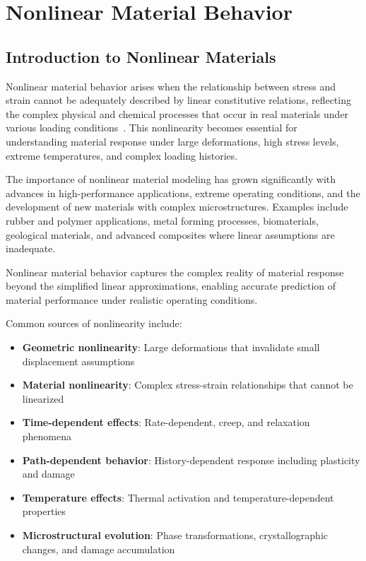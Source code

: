 \chapter{Nonlinear Material Behavior}

\section{Introduction to Nonlinear Materials}

Nonlinear material behavior arises when the relationship between stress and strain cannot be adequately described by linear constitutive relations, reflecting the complex physical and chemical processes that occur in real materials under various loading conditions~\autocite{Sadd.2019}. This nonlinearity becomes essential for understanding material response under large deformations, high stress levels, extreme temperatures, and complex loading histories.

The importance of nonlinear material modeling has grown significantly with advances in high-performance applications, extreme operating conditions, and the development of new materials with complex microstructures. Examples include rubber and polymer applications, metal forming processes, biomaterials, geological materials, and advanced composites where linear assumptions are inadequate.

\begin{keypoint}
Nonlinear material behavior captures the complex reality of material response beyond the simplified linear approximations, enabling accurate prediction of material performance under realistic operating conditions.
\end{keypoint}

Common sources of nonlinearity include:
\begin{itemize}
\item \textbf{Geometric nonlinearity}: Large deformations that invalidate small displacement assumptions
\item \textbf{Material nonlinearity}: Complex stress-strain relationships that cannot be linearized
\item \textbf{Time-dependent effects}: Rate-dependent, creep, and relaxation phenomena
\item \textbf{Path-dependent behavior}: History-dependent response including plasticity and damage
\item \textbf{Temperature effects}: Thermal activation and temperature-dependent properties
\item \textbf{Microstructural evolution}: Phase transformations, crystallographic changes, and damage accumulation
\end{itemize}

